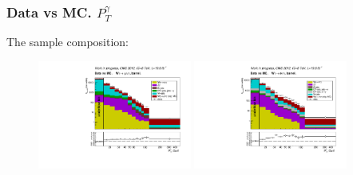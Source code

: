 \begin{frame}\frametitle{Data vs MC. $P_T^{\gamma}$}
\scriptsize
The sample composition:
  \begin{figure}[htb]
    \begin{center}
       \includegraphics[width=0.45\textwidth]{../figs/figs_v11/MUON_WGamma/PrepareYields/c_TotalDATAvsMC_Barrel__phoEt.pdf} \includegraphics[width=0.45\textwidth]{../figs/figs_v11/ELECTRON_WGamma/PrepareYields/c_TotalDATAvsMC_Barrel__phoEt.pdf} 
    \end{center}
  \end{figure}
\end{frame}
